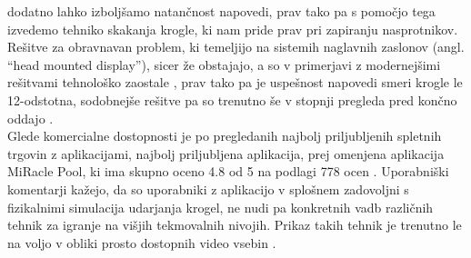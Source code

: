 \documentclass[a4paper, 12pt]{article}
\newcommand\cmnt[1]{\textcolor{munsell}{#1}}
\begin{document}
dodatno lahko izboljšamo natančnost napovedi, prav tako pa s pomočjo tega izvedemo tehniko skakanja krogle, ki nam pride prav pri zapiranju nasprotnikov. \\
Rešitve za obravnavan problem, ki temeljijo na sistemih naglavnih zaslonov (angl. ``head mounted display''), sicer že obstajajo, a so v primerjavi z modernejšimi rešitvami tehnološko zaostale \cite{Sargaana2005Collaborative}, prav tako pa je uspešnost napovedi smeri krogle le 12-odstotna, sodobnejše rešitve pa so trenutno še v stopnji pregleda pred končno oddajo \cite{Yan2024Enhancing}. \\ Glede komercialne dostopnosti je po pregledanih najbolj priljubljenih spletnih trgovin z aplikacijami, najbolj priljubljena aplikacija, prej omenjena aplikacija MiRacle Pool, ki ima skupno oceno 4.8 od 5 na podlagi 778 ocen \cite{MiraclePool}. Uporabniški komentarji kažejo, da so uporabniki z aplikacijo v splošnem zadovoljni s fizikalnimi simulacija udarjanja krogel, ne nudi pa konkretnih vadb različnih tehnik za igranje na višjih tekmovalnih nivojih. Prikaz takih tehnik je trenutno le na voljo v obliki prosto dostopnih video vsebin \cite{EDU}.    

\end{document}
